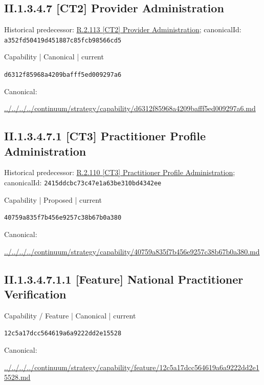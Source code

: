 \documentclass[10pt,a4paper]{article}
\begin{document}
\subsection*{II.1.3.4.7 [CT2] Provider Administration}
Historical predecessor: \hyperref[element-a352fd50419d451887c85fcb98566cd5]{R.2.113 [CT2] Provider Administration}; canonicalId: \texttt{a352fd50419d451887c85fcb98566cd5}\par
\label{element-d6312f85968a4209bafff5ed009297a6}
{\small Capability | Canonical | current}\par
\texttt{d6312f85968a4209bafff5ed009297a6}\par
Canonical: \par
{\footnotesize\url{../../../../continuum/strategy/capability/d6312f85968a4209bafff5ed009297a6.md}}\par
\subsection*{II.1.3.4.7.1 [CT3] Practitioner Profile Administration}
Historical predecessor: \hyperref[element-2415ddcbc73c47e1a63be310bd4342ee]{R.2.110 [CT3] Practitioner Profile Administration}; canonicalId: \texttt{2415ddcbc73c47e1a63be310bd4342ee}\par
\label{element-40759a835f7b456e9257c38b67b0a380}
{\small Capability | Proposed | current}\par
\texttt{40759a835f7b456e9257c38b67b0a380}\par
Canonical: \par
{\footnotesize\url{../../../../continuum/strategy/capability/40759a835f7b456e9257c38b67b0a380.md}}\par
\subsection*{II.1.3.4.7.1.1 [Feature] National Practitioner Verification}
\label{element-12c5a17dcc564619a6a9222dd2e15528}
{\small Capability / Feature | Canonical | current}\par
\texttt{12c5a17dcc564619a6a9222dd2e15528}\par
Canonical: \par
{\footnotesize\url{../../../../continuum/strategy/capability/feature/12c5a17dcc564619a6a9222dd2e15528.md}}\par
\end{document}
